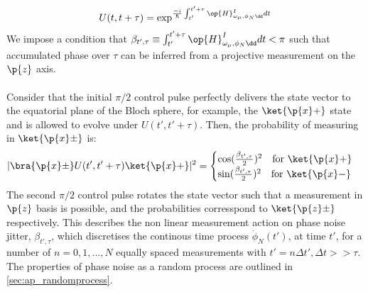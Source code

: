 \begin{align}
U(t, t + \tau) & = \exp^{\frac{-i}{\hbar} \int_{t'}^{t' + \tau} \op{H}^{I}_{\omega_\mu,\phi_N\dd} dt} \\
\end{align}
We impose a condition that $\beta_{t', \tau} \equiv \int_{t'}^{t' + \tau} \op{H}^{I}_{\omega_\mu,\phi_N\dd} dt < \pi$ such that accumulated phase over $\tau$ can be inferred from a projective measurement on the $\p{z}$ axis. 
\\
\\
Consider that the initial $\pi/2$ control pulse perfectly delivers the state vector to the equatorial plane of the Bloch sphere, for example, the  $\ket{\p{x} +}$ state and is allowed to evolve under $U(t', t' + \tau)$. Then, the probability of measuring in $\ket{\p{x} \pm}$ is:
\begin{align}
|\bra{\p{x} \pm} U(t', t' + \tau) \ket{\p{x} +}|^2= \begin{cases} \cos(\frac{\beta_{t', \tau}}{2})^2 \quad \text{for $ \ket{\p{x} +}$} \\   \sin(\frac{\beta_{t', \tau}}{2})^2  \quad \text{for $ \ket{\p{x} -}$} \end{cases}
\end{align}
The second $\pi/2$ control pulse rotates the state vector such that a measurement in $\p{z}$ basis is possible, and the probabilities corresspond to $\ket{\p{z} \pm}$
respectively. This describes the non linear measurement action on phase noise jitter, $\beta_{t', \tau}$, which discretises the continous time process $\dot{\phi}_N(t')$, at time $t'$, for a number of $n= 0, 1, ..., N$ equally spaced measurements with $t' = n \Delta t', \Delta t >> \tau$.  The properties of phase noise as a random process are outlined in \cref{sec:ap_randomprocess}.
